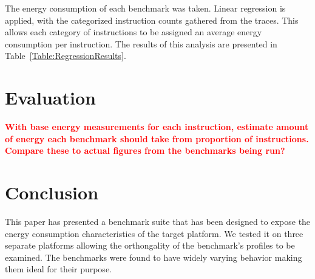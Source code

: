 \documentclass[twocolumn]{article}
\newcommand{\todo}[1]{\textbf{\textcolor{red}{#1}}}
\begin{document}
The energy consumption of each benchmark was taken. Linear regression is applied, with the categorized instruction counts gathered from the traces. This allows each category of instructions to be assigned an average energy consumption per instruction. The results of this analysis are presented in Table~\ref{Table:RegressionResults}.


\section{Evaluation}

\todo{With base energy measurements for each instruction, estimate amount of energy each benchmark should take from proportion of instructions. Compare these to actual figures from the benchmarks being run?}

\section{Conclusion}

This paper has presented a benchmark suite that has been designed to expose the energy consumption characteristics of the target platform. We tested it on three separate platforms allowing the orthongality of the benchmark's profiles to be examined. The benchmarks were found to have widely varying behavior making them ideal for their purpose. \todo{}

\printbibliography
\end{document}
